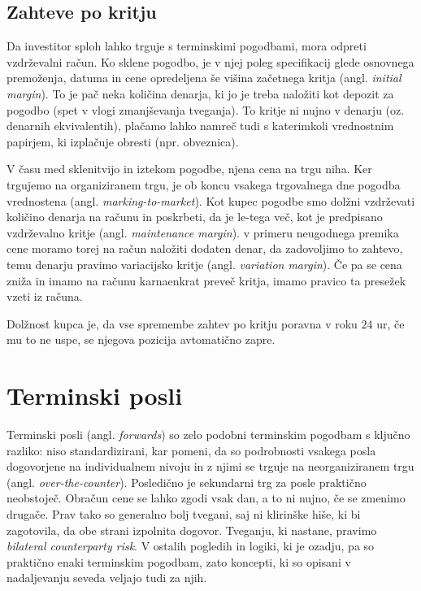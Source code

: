 \documentclass[a4paper, 11pt]{article}
\begin{document}
\subsection{Zahteve po kritju}
Da investitor sploh lahko trguje s terminskimi pogodbami, mora odpreti vzdrževalni račun. 
Ko sklene pogodbo, je v njej poleg specifikacij glede osnovnega premoženja, datuma in cene 
opredeljena še višina začetnega kritja (angl. \textit{initial margin}). To je pač neka 
količina denarja, ki jo je treba naložiti kot depozit za pogodbo (spet v vlogi zmanjševanja 
tveganja). To kritje ni nujno v denarju (oz. denarnih ekvivalentih), plačamo lahko namreč 
tudi s katerimkoli vrednostnim papirjem, ki izplačuje obresti (npr. obveznica).

V času med sklenitvijo in iztekom pogodbe, njena cena na trgu niha. Ker trgujemo na organiziranem
trgu, je ob koncu vsakega trgovalnega dne pogodba vrednostena (angl. \textit{marking-to-market}). 
Kot kupec pogodbe smo dolžni vzdrževati količino denarja na računu in poskrbeti, da je le-tega več, 
kot je predpisano vzdrževalno kritje (angl. \textit{maintenance margin}). v primeru neugodnega 
premika cene moramo torej na račun naložiti dodaten denar, da zadovoljimo to zahtevo, temu denarju 
pravimo variacijsko kritje (angl. \textit{variation margin}). Če pa se cena zniža in imamo na 
računu karnaenkrat preveč kritja, imamo pravico ta presežek vzeti iz računa. 

Dolžnost kupca je, da vse spremembe zahtev po kritju poravna v roku $24$ ur, če mu to ne uspe, se
njegova pozicija avtomatično zapre.

\section{Terminski posli}
Terminski posli (angl. \textit{forwards}) so zelo podobni terminskim pogodbam s ključno razliko:
niso standardizirani, kar pomeni, da so podrobnosti vsakega posla dogovorjene na individualnem nivoju 
in z njimi se trguje na neorganiziranem trgu (angl. \textit{over-the-counter}). Posledično je sekundarni 
trg za posle praktično neobstoječ. Obračun cene se lahko zgodi vsak dan, a to ni nujno, če se zmenimo 
drugače. Prav tako so generalno bolj tvegani, saj ni klirinške hiše, ki bi zagotovila, da obe strani 
izpolnita dogovor. Tveganju, ki nastane, pravimo \textit{bilateral counterparty risk}. V ostalih pogledih
in logiki, ki je ozadju, pa so praktično enaki terminskim pogodbam, zato koncepti, ki so opisani v 
nadaljevanju seveda veljajo tudi za njih.
\end{document}
